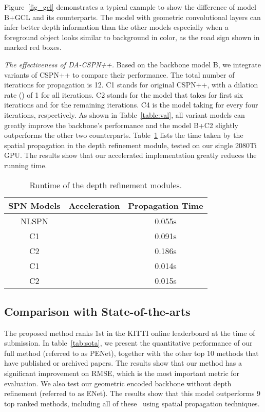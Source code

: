 \documentclass[letterpaper, 10 pt, conference]{ieeeconf}
\begin{document}
Figure~\ref{fig_gcl} demonstrates a typical example to show the difference of model B+GCL and its counterparts. The model with geometric convolutional layers can infer better depth information than the other models especially when a foreground object looks similar to background in color, as the road sign shown in marked red boxes. 












\textit{The effectiveness of DA-CSPN++.} Based on the backbone model B, we integrate variants of CSPN++ to compare their performance. The total number of iterations for propagation is 12. C1 stands for original CSPN++, with a dilation rate () of 1 for all iterations. C2 stands for the model that takes  for first six iterations and  for the remaining iterations. C4 is the model taking  for every four iterations, respectively. As shown in Table~\ref{table:val}, all variant models can greatly improve the backbone's performance and the model B+C2 slightly outperforms the other two counterparts. Table~\ref{table:runtime} lists the time taken by the spatial propagation in the depth refinement module, tested on our single 2080Ti GPU. The results show that our accelerated implementation greatly reduces the running time. 





\begin{table}[htbp]
	\begin{center}
		\begin{tabular}{c|c|c}
		\hline 
			SPN Models & Acceleration & Propagation Time \\ \hline 
			NLSPN\cite{Park2020NLSPN} & \textemdash &0.055s \\ 
			C1\cite{Cheng2020CSPN++} & & 0.091s\\ 
			C2 & & 0.186s \\
			C1 &  & 0.014s\\ 
			C2 &  & 0.015s \\ \hline
\end{tabular}
	\end{center}
	\caption{Runtime of the depth refinement modules.}
	\label{table:runtime}
\end{table}


\subsection{Comparison with State-of-the-arts}
The proposed method ranks 1st in the KITTI online leaderboard at the time of submission. In table~\ref{tab:sota}, we present the quantitative performance of our full method (referred to as PENet), together with the other top 10 methods that have published or archived papers. The results show that our method has a significant improvement on RMSE, which is the most important metric for evaluation. We also test our geometric encoded backbone without depth refinement (referred to as ENet). The results show that this model outperforms 9 top ranked methods, including all of these~\cite{Park2020NLSPN,Cheng2020CSPN++,Xu2020dspn} using spatial propagation techniques.
\end{document}
